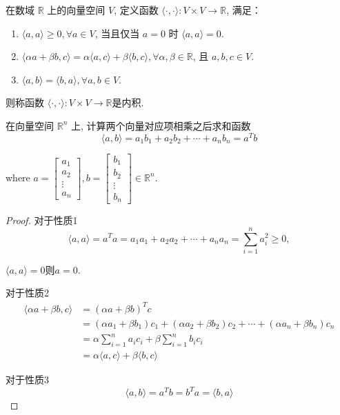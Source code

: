 \begin{definition}[内积]
    在数域 \( \mathbb{R} \) 上的向量空间 \( V \), 定义函数 \( \langle\cdot,\cdot\rangle:V \times V \rightarrow \mathbb{R} \), 满足：

    \begin{enumerate}
        \item $ \langle{a}, {a}\rangle \geq 0, \forall {a} \in V $, 当且仅当 $a=0$ 时 $ \langle a, a\rangle=0 $.
        \item \( \langle\alpha {a}+\beta {b}, c\rangle=\alpha\langle{a}, c\rangle+\beta\langle{b}, c\rangle, \forall \alpha, \beta \in \mathbb{R} \), 且 \( {a}, {b}, c \in V \).
        \item \( \langle{a}, {b}\rangle=\langle{b}, {a}\rangle, \forall {a}, {b} \in V \).
    \end{enumerate}

    则称函数 \( \langle\cdot,\cdot\rangle:V \times V \rightarrow \mathbb{R} \)是内积. 
\end{definition}

\begin{example}
    在向量空间 \( \mathbb{R}^{n} \) 上,  计算两个向量对应项相乘之后求和函数
    $$ \langle a, b\rangle=a_{1} b_{1}+a_{2} b_{2}+\cdots+a_{n} b_{n}=a^{T}{b} $$

where \( a=\left[\begin{array}{c}a_{1} \\ a_{2} \\ \vdots \\ a_{n}\end{array}\right], b=\left[\begin{array}{c}b_{1} \\ b_{2} \\ \vdots \\ b_{n}\end{array}\right] \in \mathbb{R}^{n} \).
\end{example}

\begin{proof}
对于性质1
    $$\langle a, a\rangle=a^T a=a_{1} a_{1}+a_{2} a_{2}+\cdots+a_{n} a_{n}=\sum_{i=1}^{n} a_{i}^{2} \geq 0,$$

    $\langle a, a\rangle=0 则 a=0$.

    对于性质2
    $$\begin{aligned} \langle\alpha a+\beta {b}, {c}\rangle 
    & = (\alpha a+\beta {b})^T c 
    \\ &=\left(\alpha a_{1}+\beta b_{1}\right) c_{1}+\left(\alpha a_{2}+\beta b_{2}\right) c_{2}+\cdots+\left(\alpha a_{n}+\beta b_{n}\right) c_{n} 
    \\ &=\alpha \sum_{i=1}^{n} a_{i} c_{i}+\beta \sum_{i=1}^{n} b_{i} c_{i}
    \\ &=\alpha\langle a, c\rangle+\beta\langle b, c\rangle\end{aligned} $$

    对于性质3
    $$ \langle a, b\rangle=a^{{T}} b=b^{{T}} a=\langle b, a\rangle $$
\end{proof}


